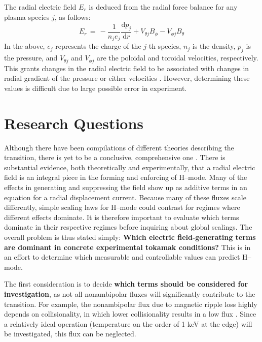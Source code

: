 The radial electric field $E_r$ is deduced from the radial force balance for any plasma species $j$, as follows:
\begin{equation}
	E_r \,=\, -\frac{1}{n_j e_j} \frac{\text{d} p_j}{\text{d} r} + V_{\theta j} B_\phi - V_{\phi j} B_\theta
	\label{eq:E_r}
\end{equation}
In the above, $e_j$ represents the charge of the $j$-th species, $n_j$ is the density, $p_j$ is the pressure, and $V_{\theta j}$ and $V_{\phi j}$ are the poloidal and toroidal velocities, respectively.
This grants changes in the radial electric field to be associated with changes in radial gradient of the pressure or either velocities \cite{connor_review_2000}\cite{staps_backstepping_2017}.
However, determining these values is difficult due to large possible error in experiment.

\section{Research Questions}
Although there have been compilations of different theories describing the transition, there is yet to be a conclusive, comprehensive one \cite{connor_review_2000}.
There is substantial evidence, both theoretically and experimentally, that a radial electric field is an integral piece in the forming and enforcing of H--mode.
Many of the effects in generating and suppressing the field show up as additive terms in an equation for a radial displacement current.
Because many of these fluxes scale differently, simple scaling laws for H--mode could contrast for regimes where different effects dominate.
It is therefore important to evaluate which terms dominate in their respective regimes before inquiring about global scalings.
The overall problem is thus stated simply: \textbf{Which electric field-generating terms are dominant in concrete experimental tokamak conditions?}
This is in an effort to determine which measurable and controllable values can predict H--mode.

The first consideration is to decide \textbf{which terms should be considered for investigation}, as not all nonambipolar fluxes will significantly contribute to the transition.
For example, the nonambipolar flux due to magnetic ripple loss highly depends on collisionality, in which lower collisionality results in a low flux \cite{stringer_ripple_1972}.
Since a relatively ideal operation (temperature on the order of 1 keV at the edge) will be investigated, this flux can be neglected.

